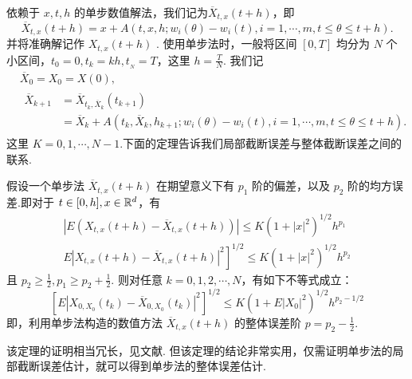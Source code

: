 依赖于 $x,t,h$ 的单步数值解法，我们记为$\overline{X}_{t,x}(t+h)$，即
\begin{equation}\label{eq3.2}
	\overline{X}_{t,x}(t+h) = x+A(t,x,h;w_i(\theta) - w_i(t),i=1,\cdots,m,t\le \theta \le t+h).
\end{equation}
并将准确解记作 $X_{t,x}(t+h)$ . 使用单步法时，一般将区间 $[0,T]$ 均分为 $N$ 个小区间，$t_0=0,t_k = kh, t_{_N} = T$，这里 $h = \frac TN$. 我们记
\begin{equation}\label{eq3.3}
	\begin{aligned}
	&\overline{X}_0 = X_0 = X(0),\\ 
	&
	\begin{aligned}
		\overline{X}_{k+1} &= \overline X_{t_k,\overline X_k}(t_{k+1})\\
		&=\overline X_k + A(t_k,\overline X_k ,h_{k+1}; w_i(\theta) - w_i(t),i=1,\cdots,m,t\le \theta \le t+h).
	\end{aligned}
	\end{aligned}
\end{equation}
这里 $K=0,1,\cdots,N-1$.下面的定理告诉我们局部截断误差与整体截断误差之间的联系. 
\begin{theorem}\label{thm_3.1}
	假设一个单步法 $\overline X_{t,x}(t+h)$ 在期望意义下有 $p_1$ 阶的偏差，以及 $p_2$ 阶的均方误差.即对于 $t \in [0,h],x \in \mathbb{R}^d$，有
	\begin{equation}\label{eq3.4}
		\begin{aligned}
		\left|{E}\left(X_{t, x}(t+h)-\overline{X}_{t, x}(t+h)\right)\right| \leq K\left(1+|x|^{2}\right)^{1 / 2} h^{p_{1}} \\
		\left.{E}\left|X_{t, x}(t+h)-\overline{X}_{t, x}(t+h)\right|^{2}\right]^{1 / 2} \leq K\left(1+|x|^{2}\right)^{1 / 2} h^{p_{2}}
		\end{aligned}
	\end{equation}
	且 $p_2 \ge \frac12,p_1\ge p_2+\frac12$. 
	则对任意 $k=0,1,2,\cdots,N$，有如下不等式成立：
	\begin{equation}\label{eq3.5}
		\left[E\left|X_{0, X_{0}}\left(t_{k}\right)-\overline{X}_{0, X_{0}}\left(t_{k}\right)\right|^{2}\right]^{1 / 2} \leq K\left(1+E\left|X_{0}\right|^{2}\right)^{1 / 2} h^{p_{2}-1 / 2}
	\end{equation}
	即，利用单步法构造的数值方法 $\overline{X}_{t,x}(t+h)$ 的整体误差阶 $p = p_2-\frac12$. 
\end{theorem}
该定理的证明相当冗长，见文献\cite{book_error}. 但该定理的结论非常实用，仅需证明单步法的局部截断误差估计，就可以得到单步法的整体误差估计. 



